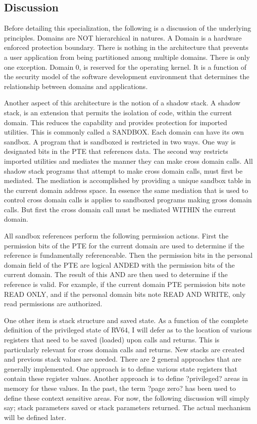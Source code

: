 \documentclass{article}
\begin{document}
\begin{appendices}
\subsection{Discussion}

Before detailing this specialization,  the following is a discussion of the underlying principles.  Domains are NOT hierarchical in natures.  A Domain is a hardware  enforced protection boundary.  There is nothing in the architecture that prevents a   user application from being partitioned among multiple domains.  There is only one exception.  Domain 0,  is reserved for the operating kernel.  It is a function of the security model of the software development environment that determines the relationship between domains and applications.

Another aspect of this architecture is the notion of a shadow stack.  A shadow stack,  is an extension that permits the isolation of code, within   the current domain.  This  reduces the capability and provides protection for imported utilities.  This is commonly called a SANDBOX.  Each domain can have its own sandbox.  A program  that is sandboxed is restricted in two ways.  One way is  designated bits in the PTE that references data. The second way  restricts imported utilities   and mediates  the manner  they can make cross domain calls.  All  shadow stack programs  that attempt to make cross domain calls,  must first be mediated.  The mediation is accomplished by providing  a unique sandbox  table in the current domain address space.  In essence the same  mediation  that is used to control cross domain calls is applies to sandboxed programs making gross domain calls.  But first the cross domain call must be mediated WITHIN the current domain. 

All sandbox references perform the following permission actions.  First the permission  bits of the PTE for the current domain are used to determine if the reference is  fundamentally referenceable.  Then the permission bits in the  personal domain field of the PTE are logical ANDED with the  permission bits of the current domain. The result of this AND are then used to determine if the reference is valid. For example,  if the current domain PTE permission bits note READ ONLY,  and if the personal domain bits note READ AND WRITE,  only read permissions are authorized.

One other item is stack structure and saved state. As a function of the complete definition of the privileged state of RV64,   I will defer as to the location of various registers that need to be saved (loaded)  upon calls and returns. This is particularly relevant for cross domain calls and returns. New stacks are created and previous stack  values are needed.  There are 2 general approaches   that are generally implemented.  One approach is to define various state registers that contain these register values.  Another approach is to define ?privileged? areas in memory for these values.  In the past,  the term ?page zero? has been used to define these context sensitive areas.   For now, the following discussion will simply say;  stack parameters saved  or stack parameters returned.  The actual mechanism  will be defined later.



\end{appendices}
\end{document}
